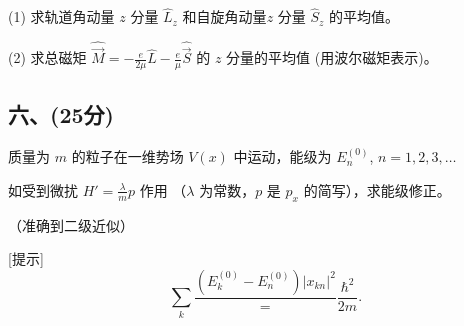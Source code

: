 (1) 求轨道角动量 $z$ 分量 $\hat{L}_z$ 和自旋角动量$z$ 分量 $\hat{S}_z$ 的平均值。

(2) 求总磁矩 $\hat{\vec M} = -\frac{e}{2\mu} \hat{L} - \frac{e}{\mu} \hat{\vec S}$ 的 $z$ 分量的平均值 (用波尔磁矩表示)。
\subsection{六、(25分)}
质量为 $m$ 的粒子在一维势场 $V(x)$ 中运动，能级为 $E_n^{(0)}$, $n = 1, 2, 3, \ldots$

如受到微扰 $H' = \frac{\lambda}{m} p$ 作用 （$\lambda$ 为常数，$p$ 是 $p_x$ 的简写），求能级修正。

（准确到二级近似）

[提示] $$\quad \sum_k \frac{\left( E_k^{(0)} - E_n^{(0)} \right) \left| x_{kn} \right|^2} = \frac{\hbar^2}{2m}.~$$